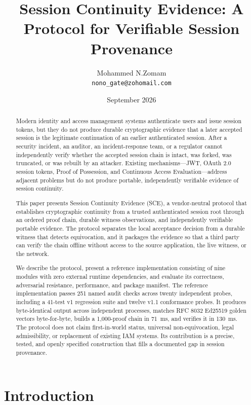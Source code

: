 \documentclass[11pt,a4paper]{article}
\title{Session Continuity Evidence: A Protocol for Verifiable Session Provenance}
\author{Mohammed N.Zomam\\ \texttt{nono\_gate@zohomail.com}}
\date{September 2026}
\begin{document}
\maketitle

\begin{abstract}
Modern identity and access management systems authenticate users and issue session tokens, but they do not produce durable cryptographic evidence that a later accepted session is the legitimate continuation of an earlier authenticated session. After a security incident, an auditor, an incident-response team, or a regulator cannot independently verify whether the accepted session chain is intact, was forked, was truncated, or was rebuilt by an attacker. Existing mechanisms---JWT, OAuth 2.0 session tokens, Proof of Possession, and Continuous Access Evaluation---address adjacent problems but do not produce portable, independently verifiable evidence of session continuity.

This paper presents Session Continuity Evidence (SCE), a vendor-neutral protocol that establishes cryptographic continuity from a trusted authenticated session root through an ordered proof chain, durable witness observations, and independently verifiable portable evidence. The protocol separates the local acceptance decision from a durable witness that detects equivocation, and it packages the evidence so that a third party can verify the chain offline without access to the source application, the live witness, or the network.

We describe the protocol, present a reference implementation consisting of nine modules with zero external runtime dependencies, and evaluate its correctness, adversarial resistance, performance, and package manifest. The reference implementation passes 251 named audit checks across twenty independent probes, including a 41-test v1 regression suite and twelve v1.1 conformance probes. It produces byte-identical output across independent processes, matches RFC 8032 Ed25519 golden vectors byte-for-byte, builds a 1{,}000-proof chain in 71~ms, and verifies it in 130~ms. The protocol does not claim first-in-world status, universal non-equivocation, legal admissibility, or replacement of existing IAM systems. Its contribution is a precise, tested, and openly specified construction that fills a documented gap in session provenance.
\end{abstract}

\section{Introduction}
\end{document}
